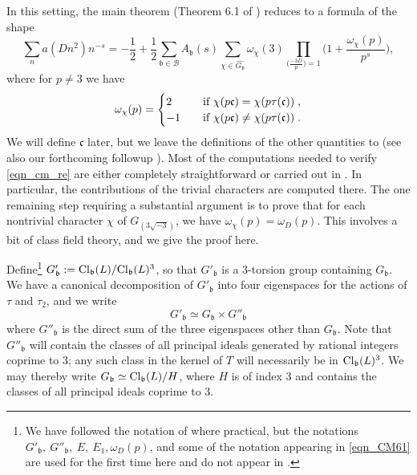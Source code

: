 \documentclass[12pt]{amsart}
\theoremstyle{remark}
\numberwithin{theorem}{section} \numberwithin{equation}{section}
\newcommand{\mfb}{\mathfrak{b}}
\newcommand{\mfc}{\mathfrak{c}}
\newcommand{\Cl}{{\text {\rm Cl}}}
\begin{document}
In this setting, the main theorem (Theorem 6.1 of \cite{CM}) reduces to a formula of the shape
\begin{equation}\label{eqn_CM61}
\sum_n a(D n^2) n^{-s} = -\frac{1}{2} + \frac{1}{2} \sum_{\mfb \in \mathcal{B}} A_{\mfb}(s)
\sum_{\chi \in \widehat{G_{\mfb}}} \omega_{\chi}(3) \prod_{ \big( \frac{-3D}{p} \big) = 1}
\bigg(1 + \frac{ \omega_{\chi}(p)}{p^s} \bigg),
\end{equation} 
where for $p \neq 3$ we have
$$\omega_{\chi}(p)=\begin{cases}
2&\text{\quad if $\chi(p\mfc)=\chi(p\tau(\mfc))$}\;,\\
-1&\text{\quad if $\chi(p\mfc)\ne\chi(p\tau(\mfc))$}\;.\end{cases}$$
We will define $\mathfrak{c}$ later, but we leave the definitions of the other quantities to \cite{CM, M} (see also
our forthcoming followup \cite{CT}). Most of the computations needed to verify \eqref{eqn_cm_re} are either
completely straightforward or carried out in \cite{CM, M}. In particular, the contributions of the trivial characters
are computed there. The one remaining step requiring a substantial argument is
to prove that for each nontrivial character $\chi$ of $G_{(3\sqrt{-3})}$, 
we have $\omega_{\chi}(p) = \omega_D(p)$.
This involves a bit of class field theory, and we give the proof here.

Define\footnote{We have followed the notation of \cite{CM} where practical, but the notations
$G'_{\mfb}, \ G''_{\mfb}, \ E, \ E_1, \omega_D(p)$, and some of the notation appearing in \eqref{eqn_CM61} are used for the first time here and do not
appear in \cite{CM}.} $G'_{\mfb} := \Cl_{\mfb}(L)/\Cl_{\mfb}(L)^3$, so that $G'_{\mfb}$ is
a 3-torsion group containing $G_{\mfb}$. We have a canonical decomposition of $G'_{\mfb}$ into four
eigenspaces for the actions of $\tau$ and $\tau_2$, and we write
\begin{equation}\label{eqn_nci}
G'_{\mfb} \simeq G_{\mfb} \times G''_{\mfb}
\end{equation}
where $G''_{\mfb}$ is the direct sum of the three eigenspaces other than $G_{\mfb}$. Note that $G''_{\mfb}$
will contain the classes of all principal ideals generated by rational integers coprime to $3$; any such class
in the kernel of $T$ will necessarily be in $\Cl_{\mfb}(L)^3$. We may thereby write
$G_{\mfb} \simeq \Cl_{\mfb}(L)/H$, where $H$ is of index $3$ and contains the classes of all principal ideals
coprime to $3$.
\end{document}
